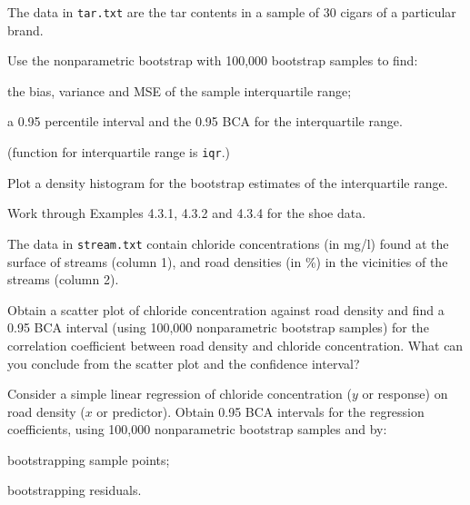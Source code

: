 \begin{exercise}
The data in {\tt tar.txt} are the tar contents in a sample of 30 cigars of a particular brand.
\begin{asparaenum}[(a)]
\item Use the nonparametric bootstrap with 100,000 bootstrap samples to find:
\begin{asparaenum}[(i)]
\item the bias, variance and MSE of the sample interquartile range;

\item	a 0.95 percentile interval and the 0.95 BCA for the interquartile range.
\end{asparaenum}
(\Matlab function for interquartile range is {\tt iqr}.)

\item	Plot a density histogram for the bootstrap estimates of the interquartile range.
\end{asparaenum}
\end{exercise}

\begin{exercise}
Work through Examples 4.3.1, 4.3.2 and 4.3.4 for the shoe data.
\end{exercise}

\begin{exercise}
The data in {\tt stream.txt} contain chloride concentrations (in mg/l) found at the surface of streams (column 1), and road densities (in \%) in the vicinities of the streams (column 2).
\begin{asparaenum}[(a)]
\item Obtain a scatter plot of chloride concentration against road density and find a 0.95 BCA interval (using 100,000 nonparametric bootstrap samples) for the correlation coefficient between road density and chloride concentration. What can you conclude from the scatter plot and the confidence interval?

\item	Consider a simple linear regression of chloride concentration ($y$ or response) on road density ($x$ or predictor). Obtain 0.95 BCA intervals for the regression coefficients, using 100,000 nonparametric bootstrap samples and by:
\begin{asparaenum}[(i)]
\item bootstrapping sample points;

\item	bootstrapping residuals.
\end{asparaenum}\end{asparaenum}
\end{exercise}

